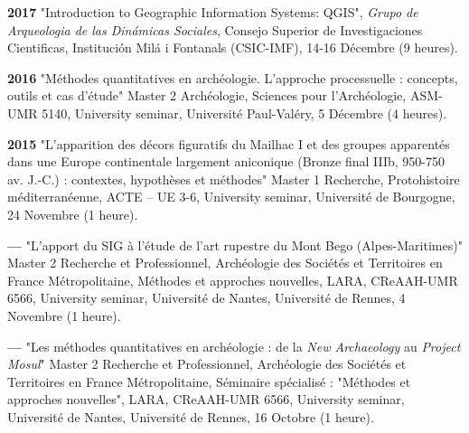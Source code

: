 \documentclass{article}
\newcommand{\fr}[1]{#1}       %
\newcommand{\en}[1]{}     %
\begin{document}
\smallbreak
\textbf{2017}
\fr{"Introduction to Geographic Information Systems: QGIS", \textit{Grupo de Arqueologia de las Dinámicas Sociales}, Consejo Superior de Investigaciones Cientificas, Institución Milá i Fontanals (CSIC-IMF), 14-16 Décembre (9 heures).}
\en{"Introduction to Geographic Information Systems: QGIS", \textit{Group of Archaeology of Social Dynamics}, Spanish National Research Council, Institución Milá i Fontanals (CSIC-IMF), December 14-16 (9 hours).}

\smallbreak
\textbf{2016}
\fr{"Méthodes quantitatives en archéologie. L'approche processuelle : concepts, outils et cas d'étude" Master 2 Archéologie, Sciences pour l'Archéologie, ASM-UMR 5140, University seminar, Université Paul-Valéry, 5 Décembre (4 heures).}
\en{"Quantitative Methods in Archaeology. The Processual Approach: Concepts, Tools, and Case Studies" Master 2 in Archaeology, Sciences for Archaeology, ASM-UMR 5140, University Seminar, Paul-Valéry University, December 5 (4 hours).}

\smallbreak
\textbf{2015}
\fr{"L'apparition des décors figuratifs du Mailhac I et des groupes apparentés dans une Europe continentale largement aniconique (Bronze final IIIb, 950-750 av. J.-C.) : contextes, hypothèses et méthodes" Master 1 Recherche, Protohistoire méditerranéenne, ACTE -- UE 3-6, University seminar, Université de Bourgogne, 24 Novembre (1 heure).}
\en{"The Emergence of Figurative Decorations from Mailhac I and Related Groups in a Predominantly Aniconic Continental Europe (Late Bronze Age IIIb, 950-750 BC): Contexts, Hypotheses, and Methods" Master 1 Research, Mediterranean Protohistory, ACTE -- UE 3-6, University Seminar, University of Burgundy, November 24 (1 hour).}

\smallbreak
\textbf{--- }
\fr{"L'apport du SIG à l'étude de l'art rupestre du Mont Bego (Alpes-Maritimes)" Master 2 Recherche et Professionnel, Archéologie des Sociétés et Territoires en France Métropolitaine, Méthodes et approches nouvelles, LARA, CReAAH-UMR 6566, University seminar, Université de Nantes, Université de Rennes, 4 Novembre (1 heure).}
\en{"The Contribution of GIS to the Study of Rock Art at Mont Bego (Alpes-Maritimes)" Master 2 Research and Professional, Archaeology of Societies and Territories in Metropolitan France, New Methods and Approaches, LARA, CReAAH-UMR 6566, University Seminar, University of Nantes, University of Rennes, November 4 (1 hour).}

\smallbreak
\textbf{--- }
\fr{"Les méthodes quantitatives en archéologie : de la \textit{New Archaeology} au \textit{Project Mosul}" Master 2 Recherche et Professionnel, Archéologie des Sociétés et Territoires en France Métropolitaine, Séminaire spécialisé : "Méthodes et approches nouvelles", LARA, CReAAH-UMR 6566, University seminar, Université de Nantes, Université de Rennes, 16 Octobre (1 heure).}
\en{"Quantitative Methods in Archaeology: From \textit{New Archaeology} to \textit{Project Mosul}" Master 2 Research and Professional, Archaeology of Societies and Territories in Metropolitan France, Specialized Seminar: "New Methods and Approaches", LARA, CReAAH-UMR 6566, University Seminar, University of Nantes, University of Rennes, October 16 (1 hour).}
\end{document}
